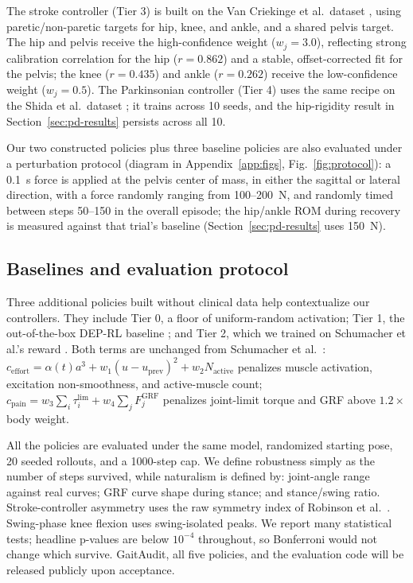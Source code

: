 \documentclass{article}
\begin{document}
The stroke controller (Tier 3) is built on the Van Criekinge et al.\ dataset \cite{vancriekinge2023fullbody}, using paretic/non-paretic targets for hip, knee, and ankle, and a shared pelvis target. The hip and pelvis receive the high-confidence weight ($w_j=3.0$), reflecting strong calibration correlation for the hip ($r=0.862$) and a stable, offset-corrected fit for the pelvis; the knee ($r=0.435$) and ankle ($r=0.262$) receive the low-confidence weight ($w_j=0.5$). The Parkinsonian controller (Tier 4) uses the same recipe on the Shida et al.\ dataset \cite{shida2023public}; it trains across 10 seeds, and the hip-rigidity result in Section~\ref{sec:pd-results} persists across all 10.

Our two constructed policies plus three baseline policies are also evaluated under a perturbation protocol (diagram in Appendix~\ref{app:figs}, Fig.~\ref{fig:protocol}): a 0.1~s force is applied at the pelvis center of mass, in either the sagittal or lateral direction, with a force randomly ranging from 100--200~N, and randomly timed between steps 50--150 in the overall episode; the hip/ankle ROM during recovery is measured against that trial's baseline (Section~\ref{sec:pd-results} uses 150~N).

\subsection{Baselines and evaluation protocol}
\label{sec:baselines}
\label{sec:eval}

Three additional policies built without clinical data help contextualize our controllers. They include Tier 0, a floor of uniform-random activation; Tier 1, the out-of-the-box DEP-RL baseline \cite{schumacher2023deprl}; and Tier 2, which we trained on Schumacher et al.'s reward \cite{schumacher2023natural}. Both terms are unchanged from Schumacher et al.~\cite{schumacher2023natural}: $c_{\mathrm{effort}} = \alpha(t) a^3 + w_1(u-u_{\mathrm{prev}})^2 + w_2 N_{\mathrm{active}}$ penalizes muscle activation, excitation non-smoothness, and active-muscle count; $c_{\mathrm{pain}} = w_3\sum_i \tau_i^{\mathrm{lim}} + w_4\sum_j F_j^{\mathrm{GRF}}$ penalizes joint-limit torque and GRF above $1.2\times$ body weight.

All the policies are evaluated under the same model, randomized starting pose, 20 seeded rollouts, and a 1000-step cap. We define robustness simply as the number of steps survived, while naturalism is defined by: joint-angle range against real curves; GRF curve shape during stance; and stance/swing ratio. Stroke-controller asymmetry uses the raw symmetry index of Robinson et al.~\cite{robinson1987symmetry}. Swing-phase knee flexion uses swing-isolated peaks. We report many statistical tests; headline p-values are below $10^{-4}$ throughout, so Bonferroni would not change which survive. GaitAudit, all five policies, and the evaluation code will be released publicly upon acceptance.
\end{document}
